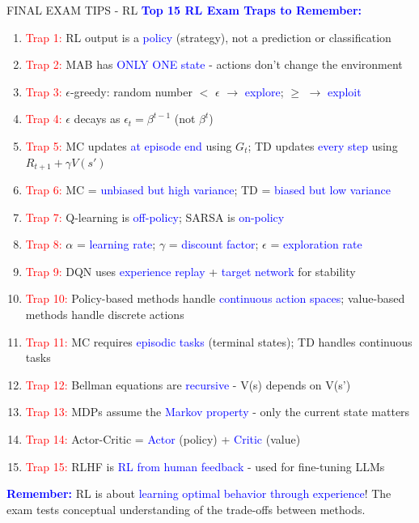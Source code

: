 \documentclass[8pt]{beamer}
\begin{document}
	\begin{frame}{FINAL EXAM TIPS - RL}
		\fontsize{6.5}{7.5}\selectfont
		\textcolor{blue}{\textbf{Top 15 RL Exam Traps to Remember:}}
		
		\begin{enumerate}
			\item \textcolor{red}{Trap 1:} RL output is a \textcolor{blue}{policy} (strategy), not a prediction or classification
			\item \textcolor{red}{Trap 2:} MAB has \textcolor{blue}{ONLY ONE state} - actions don't change the environment
			\item \textcolor{red}{Trap 3:} $\epsilon$-greedy: random number $<$ $\epsilon$ $\rightarrow$ \textcolor{blue}{explore}; $\ge$ $\rightarrow$ \textcolor{blue}{exploit}
			\item \textcolor{red}{Trap 4:} $\epsilon$ decays as $\epsilon_t = \beta^{t-1}$ (not $\beta^t$)
			\item \textcolor{red}{Trap 5:} MC updates \textcolor{blue}{at episode end} using $G_t$; TD updates \textcolor{blue}{every step} using $R_{t+1} + \gamma V(s')$
			\item \textcolor{red}{Trap 6:} MC = \textcolor{blue}{unbiased but high variance}; TD = \textcolor{blue}{biased but low variance}
			\item \textcolor{red}{Trap 7:} Q-learning is \textcolor{blue}{off-policy}; SARSA is \textcolor{blue}{on-policy}
			\item \textcolor{red}{Trap 8:} $\alpha$ = \textcolor{blue}{learning rate}; $\gamma$ = \textcolor{blue}{discount factor}; $\epsilon$ = \textcolor{blue}{exploration rate}
			\item \textcolor{red}{Trap 9:} DQN uses \textcolor{blue}{experience replay} + \textcolor{blue}{target network} for stability
			\item \textcolor{red}{Trap 10:} Policy-based methods handle \textcolor{blue}{continuous action spaces}; value-based methods handle discrete actions
			\item \textcolor{red}{Trap 11:} MC requires \textcolor{blue}{episodic tasks} (terminal states); TD handles continuous tasks
			\item \textcolor{red}{Trap 12:} Bellman equations are \textcolor{blue}{recursive} - V(s) depends on V(s')
			\item \textcolor{red}{Trap 13:} MDPs assume the \textcolor{blue}{Markov property} - only the current state matters
			\item \textcolor{red}{Trap 14:} Actor-Critic = \textcolor{blue}{Actor} (policy) + \textcolor{blue}{Critic} (value)
			\item \textcolor{red}{Trap 15:} RLHF is \textcolor{blue}{RL from human feedback} - used for fine-tuning LLMs
		\end{enumerate}
		
		\textcolor{blue}{\textbf{Remember:}} RL is about \textcolor{blue}{learning optimal behavior through experience}! The exam tests conceptual understanding of the trade-offs between methods.
	\end{frame}
	
\end{document}

